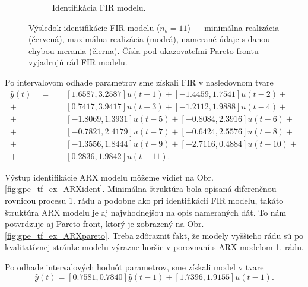 \begin{figure}
\begin{subfigure}[b]{0.48\textwidth}
		\caption{Identifikácia FIR modelu.}
		\label{fig:gpe_tf_ex_FIRident}
	\end{subfigure}
	\caption{Výsledok identifikácie FIR modelu ($ n_b = 11 $) --- minimálna realizácia (červená), maximálna realizácia (modrá), namerané údaje s danou chybou merania (čierna). Čísla pod ukazovateľmi Pareto frontu vyjadrujú rád FIR modelu.}
	\label{fig:gpe_tf_ex_FIR}
\end{figure}

Po intervalovom odhade parametrov sme získali FIR v nasledovnom tvare
\begin{equation*}
	\begin{split}
		\hat{y}(t) \quad = \quad &[1.6587, 3.2587]u(t-1) + [-1.4459, 1.7541]u(t-2) + \\
		 + &[0.7417, 3.9417]u(t-3) + [-1.2112, 1.9888]u(t-4) + \\
		 + &[-1.8069, 1.3931]u(t-5) + [-0.8084, 2.3916]u(t-6) + \\
		 + &[-0.7821, 2.4179]u(t-7) + [-0.6424, 2.5576]u(t-8) + \\
		 + &[-1.3556, 1.8444]u(t-9) + [-2.7116, 0.4884]u(t-10) + \\
		 + &[0.2836, 1.9842]u(t-11).
	\end{split}
\end{equation*}

Výstup identifikácie ARX modelu môžeme vidieť na Obr. \ref{fig:gpe_tf_ex_ARXident}. Minimálna štruktúra bola opísaná diferenčnou rovnicou procesu 1. rádu a podobne ako pri identifikácii FIR modelu, takáto štruktúra ARX modelu je aj najvhodnejšou na opis nameraných dát. To nám potvrdzuje aj Pareto front, ktorý je zobrazený na Obr. \ref{fig:gpe_tf_ex_ARXpareto}. Treba zdôrazniť fakt, že modely vyššieho rádu sú po kvalitatívnej stránke modelu výrazne horšie v porovnaní s ARX modelom 1. rádu.

Po odhade intervalových hodnôt parametrov, sme získali model v tvare
\begin{equation*}
	\hat{y}(t) = [0.7581, 0.7840]\hat{y}(t-1) + [1.7396, 1.9155]u(t-1).
\end{equation*}

